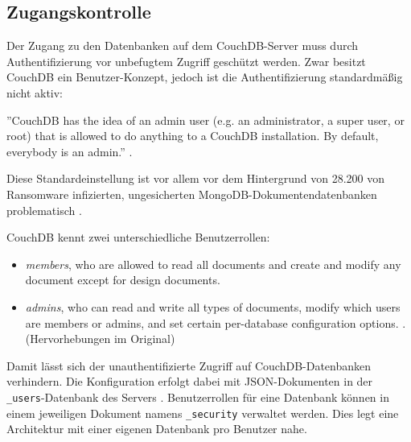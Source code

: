 \subsection{Zugangskontrolle}

Der Zugang zu den Datenbanken auf dem CouchDB-Server muss durch Authentifizierung vor unbefugtem Zugriff geschützt werden. Zwar besitzt CouchDB ein Benutzer-Konzept, jedoch ist die Authentifizierung standardmäßig nicht aktiv:

\begin{citeenv}
		''CouchDB has the idea of an admin user (e.g. an administrator, a super user, or root) that is allowed to do anything to a CouchDB installation. By default, everybody is an admin.'' \cite{couch:security}.
\end{citeenv}

Diese Standardeinstellung ist vor allem vor dem Hintergrund von 28.200 von Ransomware infizierten, ungesicherten MongoDB-Dokumentendatenbanken problematisch \cite{bleepingcomputer:mongodb:security}.

CouchDB kennt zwei unterschiedliche Benutzerrollen:

\begin{citeenv}
	\begin{itemize}
		\item \textit{members}, who are allowed to read all documents and create and modify any document except for design documents.
		\item \textit{admins}, who can read and write all types of documents, modify which users are members or admins, and set certain per-database configuration options.  \cite{couch:security}. (Hervorhebungen im Original)
	\end{itemize}
\end{citeenv}

Damit lässt sich der unauthentifizierte Zugriff auf CouchDB-Datenbanken verhindern. Die Konfiguration erfolgt dabei mit JSON-Dokumenten in der \texttt{\_users}-Datenbank des Servers \cite{couch:security}. Benutzerrollen für eine Datenbank können in einem jeweiligen Dokument namens \texttt{\_security} verwaltet werden. Dies legt eine Architektur mit einer eigenen Datenbank pro Benutzer nahe.